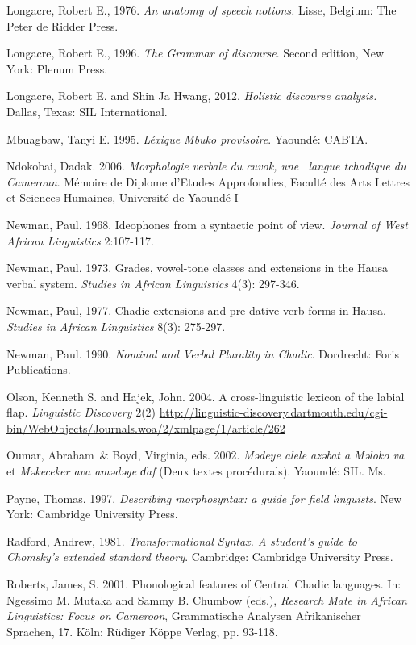 Longacre, Robert E., 1976. \textit{An anatomy of speech notions.} Lisse, Belgium: The Peter de Ridder Press.

Longacre, Robert E., 1996. \textit{The Grammar of discourse}. Second edition, New York: Plenum Press. 

Longacre, Robert E. and Shin Ja Hwang, 2012. \textit{Holistic discourse analysis.} Dallas, Texas: SIL International. 

Mbuagbaw, Tanyi E. 1995.  \textit{Léxique Mbuko provisoire}.  Yaoundé: CABTA.

Ndokobai, Dadak. 2006. \textit{Morphologie verbale du cuvok, une ~langue tchadique du Cameroun}. Mémoire de Diplome d'Etudes Approfondies, Faculté des Arts Lettres et Sciences Humaines, Université de Yaoundé I

Newman, Paul. 1968. Ideophones from a syntactic point of view.\textit{ Journal of West African Linguistics} 2:107-117.

Newman, Paul. 1973. Grades, vowel-tone classes and extensions in the Hausa verbal system. \textit{Studies in African Linguistics} 4(3): 297-346.

Newman, Paul, 1977. Chadic extensions and pre-dative verb forms in Hausa. \textit{Studies in African Linguistics }8(3): 275-297.

Newman, Paul. 1990. \textit{Nominal and Verbal Plurality in Chadic}. Dordrecht: Foris Publications. 

Olson, Kenneth S. and Hajek, John. 2004. A cross-linguistic lexicon of the labial flap. \textit{Linguistic Discovery} 2(2) \url{http://linguistic-discovery.dartmouth.edu/cgi-bin/WebObjects/Journals.woa/2/xmlpage/1/article/262} 

Oumar, Abraham~\& Boyd, Virginia, eds. 2002.  \textit{Mədeye alele azəbat a Məloko va }et \textit{Məkeceker ava amədəye ɗaf} (Deux textes procédurals).  Yaoundé:  SIL. Ms.

\begin{styleReferences}
Payne, Thomas. 1997. \textit{Describing morphosyntax: a guide for field linguists}. New York: Cambridge University Press.
\end{styleReferences}

\begin{styleReferences}
Radford, Andrew, 1981. \textit{Transformational Syntax. A student’s guide to Chomsky’s extended standard theory}. Cambridge: Cambridge University Press. 
\end{styleReferences}

Roberts, James, S. 2001. Phonological features of Central Chadic languages. In: Ngessimo M. Mutaka and Sammy B. Chumbow (eds.), \textit{Research Mate in African Linguistics: Focus on Cameroon}, Grammatische Analysen Afrikanischer Sprachen, 17. Köln: Rüdiger Köppe Verlag, pp. 93-118.

